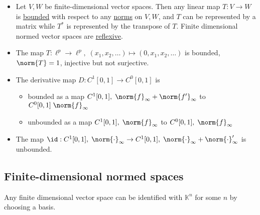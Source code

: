 \documentclass{article}
\newcommand{\K}{\mathbb{K}}
\begin{document}

\begin{eg}
    \leavevmode
    \begin{itemize}
        \item Let $V, W$ be finite-dimensional vector spaces. Then any linear map $T:V \to W$ is \hyperlink{def:boundedLinearMap}{bounded} with respect to any \hyperlink{def:normedVectorSpace}{norms} on $V, W$, and $T$ can be represented by a matrix while $T^*$ is represented by the transpose of $T$.
            Finite dimensional normed vector spaces are \hyperlink{def:reflexive}{reflexive}.
        \item The map $T : \ell^p \to \ell^p, \; (x_1, x_2, \dotsc) \mapsto (0, x_1, x_2, \dotsc)$ is bounded, $\norm{T} = 1$, injective but not surjective.
        \item The derivative map $D: C^1 [0, 1] \to C^0 [0, 1]$ is
            \begin{itemize}[label={}]
                \item bounded as a map $C^1 [0, 1], \; \norm{f}_\infty + \norm{f'}_\infty$ to $C^0[0, 1] \; \norm{f}_\infty$
                \item unbounded as a map $C^1 [0, 1], \; \norm{f}_\infty$ to $C^0[0, 1], \; \norm{f}_\infty$
            \end{itemize}
        \item The map $\id: C^1[0, 1], \; \norm{\cdot}_\infty \to C^1[0, 1], \; \norm{\cdot}_\infty + \norm{\cdot}'_\infty$ is unbounded.
    \end{itemize}
\end{eg}

\subsection{Finite-dimensional normed spaces}
\begin{fact}
    Any finite dimensional vector space can be identified with $\K^n$ for some $n$ by choosing a basis.
\end{fact}

\end{document}
